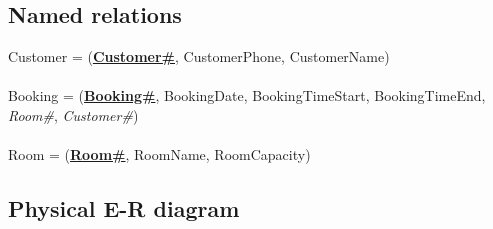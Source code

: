 \subsection{Named relations}

Customer = (\textbf{\underline{Customer\#}}, CustomerPhone, CustomerName)
\\\\
Booking = (\textbf{\underline{Booking\#}}, BookingDate, BookingTimeStart, BookingTimeEnd, \emph{Room\#}, \emph{Customer\#})
\\\\
Room = (\textbf{\underline{Room\#}}, RoomName, RoomCapacity)

\subsection{Physical E-R diagram}